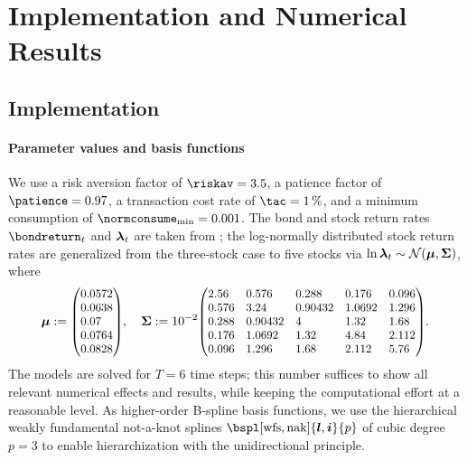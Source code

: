 \section{Implementation and Numerical Results}
\label{sec:84results}


\parbox{1em}{}
\vspace{-3em}



\printornamentsfalse
\subsection{Implementation}
\label{sec:841implementation}
\printornamentstrue

\paragraph{Parameter values and basis functions}

We use
a risk aversion factor of $\riskav = 3.5$,
a patience factor of $\patience = 0.97$,
a transaction cost rate of $\tac = \SI{1}{\percent}$, and
a minimum consumption of $\normconsume_{\min} = 0.001$.
The bond and stock return rates $\bondreturn_t$ and ${\boldsymbol{\lambda}}_t$
are taken from \cite{Cai10Stable};
the log-normally distributed stock return rates are generalized
from the three-stock case to five stocks via
$\ln {\boldsymbol{\lambda}}_t \sim \mathcal{N}({\boldsymbol{\mu}}, {\boldsymbol{\Sigma}})$, where
{%
  \setlength{\abovedisplayskip}{6pt}%
  \setlength{\belowdisplayskip}{6pt}%
  \begin{equation}
    \label{eq:financeStockReturnMeanCovariance}
    \*\mu
    :=
    \scalebox{0.92}{$
      \begin{pmatrix*}[l]
        0.0572\\
        0.0638\\
        0.07\\
        0.0764\\
        0.0828
      \end{pmatrix*}
    $},\quad
    \mat{\Sigma}
    := 10^{-2}
    \scalebox{0.92}{$
      \begin{pmatrix*}[l]
        2.56&  0.576&   0.288&   0.176&  0.096\\
        0.576& 3.24&    0.90432& 1.0692& 1.296\\
        0.288& 0.90432& 4&       1.32&   1.68\\
        0.176& 1.0692&  1.32&    4.84&   2.112\\
        0.096& 1.296&   1.68&    2.112&  5.76
      \end{pmatrix*}
    $}.
  \end{equation}%
}%
The models are solved for $T = 6$ time steps;
this number suffices to show all relevant numerical effects and results,
while keeping the computational effort at a reasonable level.
As higher-order B-spline basis functions,
we use the hierarchical weakly fundamental not-a-knot splines
$\bspl[\wfs,\nak]{\*l,\*i}{p}$ of cubic degree $p = 3$
to enable hierarchization with the unidirectional principle.

